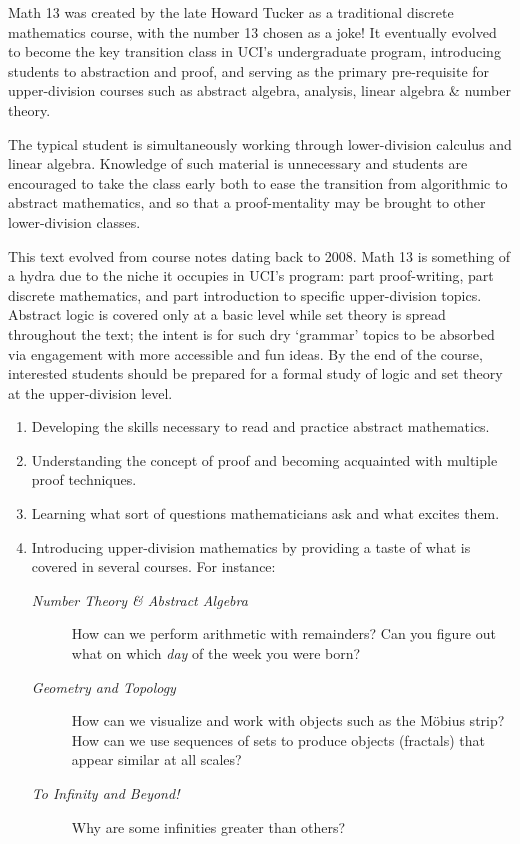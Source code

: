 Math 13 was created by the late Howard Tucker as a traditional discrete mathematics course, with the number 13 chosen as a joke! It eventually evolved to become the key transition class in UCI's undergraduate program, introducing students to abstraction and proof, and serving as the primary pre-requisite for upper-division courses such as abstract algebra, analysis, linear algebra \& number theory.\smallbreak

The typical student is simultaneously working through lower-division calculus and linear algebra. Knowledge of such material is unnecessary and students are encouraged to take the class early both to ease the transition from algorithmic to abstract mathematics, and so that a proof-mentality may be brought to other lower-division classes.\smallbreak

This text evolved from course notes dating back to 2008. Math 13 is something of a hydra due to the niche it occupies in UCI's program: part proof-writing, part discrete mathematics, and part introduction to specific upper-division topics. Abstract logic is covered only at a basic level while set theory is spread throughout the text; the intent is for such dry `grammar' topics to be absorbed via engagement with more accessible and fun ideas. By the end of the course, interested students should be prepared for a formal study of logic and set theory at the upper-division level.



\begin{enumerate}
	\item Developing the skills necessary to read and practice abstract mathematics.
	\item Understanding the concept of proof and becoming acquainted with multiple proof techniques.
	\item Learning what sort of questions mathematicians ask and what excites them.
	\item Introducing upper-division mathematics by providing a taste of what is covered in several courses. For instance:
	\begin{description}
		\item[\normalfont\emph{Number Theory \& Abstract Algebra}] How can we perform arithmetic with remainders? Can you figure out what on which \emph{day} of the week you were born? 
		\item[\normalfont\emph{Geometry and Topology}] How can we visualize and work with objects such as the Möbius strip? How can we use sequences of sets to produce objects (fractals) that appear similar at all scales?
		\item[\normalfont\emph{To Infinity and Beyond!}] Why are some infinities greater than others?
	\end{description}
\end{enumerate}


